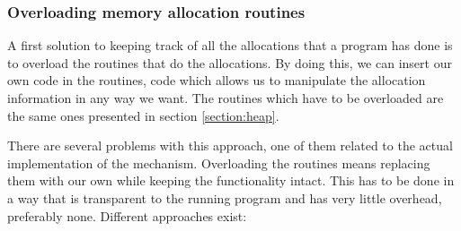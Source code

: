 \subsubsection{Overloading memory allocation routines}
\label{subsubsection:overridingroutines}

A first solution to keeping track of all the allocations that a program has done is to overload the routines that do the allocations. By doing this, we can insert our own code in the routines, code which allows us to manipulate the allocation information in any way we want. The routines which have to be overloaded are the same ones presented in section \ref{section:heap}.

There are several problems with this approach, one of them related to the actual implementation of the mechanism. Overloading the routines means replacing them with our own while keeping the functionality intact. This has to be done in a way that is transparent to the running program and has very little overhead, preferably none. Different approaches exist:
